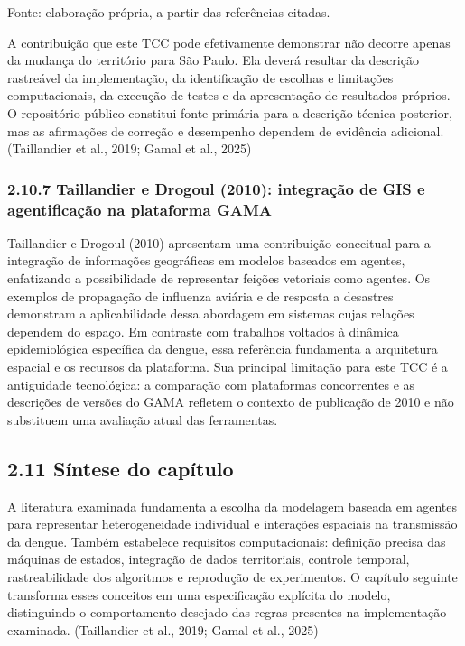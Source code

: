 Fonte: elaboração própria, a partir das referências citadas.

A contribuição que este TCC pode efetivamente demonstrar não decorre
apenas da mudança do território para São Paulo. Ela deverá resultar da
descrição rastreável da implementação, da identificação de escolhas e
limitações computacionais, da execução de testes e da apresentação de
resultados próprios. O repositório público constitui fonte primária para
a descrição técnica posterior, mas as afirmações de correção e
desempenho dependem de evidência adicional. (Taillandier et al., 2019;
Gamal et al., 2025)

\subsubsection{2.10.7 Taillandier e Drogoul (2010): integração de GIS e
agentificação na plataforma
GAMA}\label{taillandier-e-drogoul-2010-integrauxe7uxe3o-de-gis-e-agentificauxe7uxe3o-na-plataforma-gama}

Taillandier e Drogoul (2010) apresentam uma contribuição conceitual para
a integração de informações geográficas em modelos baseados em agentes,
enfatizando a possibilidade de representar feições vetoriais como
agentes. Os exemplos de propagação de influenza aviária e de resposta a
desastres demonstram a aplicabilidade dessa abordagem em sistemas cujas
relações dependem do espaço. Em contraste com trabalhos voltados à
dinâmica epidemiológica específica da dengue, essa referência fundamenta
a arquitetura espacial e os recursos da plataforma. Sua principal
limitação para este TCC é a antiguidade tecnológica: a comparação com
plataformas concorrentes e as descrições de versões do GAMA refletem o
contexto de publicação de 2010 e não substituem uma avaliação atual das
ferramentas.

\subsection{2.11 Síntese do capítulo}\label{suxedntese-do-capuxedtulo}

A literatura examinada fundamenta a escolha da modelagem baseada em
agentes para representar heterogeneidade individual e interações
espaciais na transmissão da dengue. Também estabelece requisitos
computacionais: definição precisa das máquinas de estados, integração de
dados territoriais, controle temporal, rastreabilidade dos algoritmos e
reprodução de experimentos. O capítulo seguinte transforma esses
conceitos em uma especificação explícita do modelo, distinguindo o
comportamento desejado das regras presentes na implementação examinada.
(Taillandier et al., 2019; Gamal et al., 2025)


